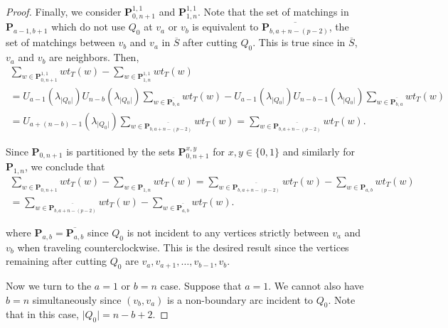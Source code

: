 \documentclass[12pt]{article}
\theoremstyle{remark}
\newcommand*{\pathset}[2]{\mathbf{P}_{#1,#2}}
\begin{document}
\begin{proof}
Finally, we consider $\pathset{0}{n+1}^{1,1}$ and $\pathset{1}{n}^{1,1}$. Note that the set of matchings in $\pathset{a-1}{b+1}$ which do not use $Q_0$ at $v_a$ or $v_b$ is equivalent to $\overline{\pathset{b}{a+n-(p-2)}}$, the set of matchings between $v_b$ and $v_a$ in $\overline{S}$ after cutting $Q_0$. This is true since in $\overline{S}$, $v_a$ and $v_b$ are neighbors. Then, \begin{align*}
  \sum_{w \in \pathset{0}{n+1}^{1,1}} wt_T(w) - \sum_{w \in \pathset{1}{n}^{1,1}} wt_T(w) \\= U_{a-1}(\lambda_{\vert Q_0\vert})U_{n-b}(\lambda_{\vert Q_0\vert}) \sum_{w \in \overline{\pathset{b}{a}}} wt_T(w) - U_{a-1}(\lambda_{\vert Q_0\vert})U_{n-b-1}(\lambda_{\vert Q_0\vert}) \sum_{w \in \overline{\pathset{b}{a}}} wt_T(w) \\
= U_{a+(n-b)-1}(\lambda_{\vert Q_0\vert})\sum_{w \in  \overline{\pathset{b}{a+n-(p-2)}}}wt_T(w) = \sum_{w \in  \overline{\pathset{b}{a+n-(p-2)}}}wt_T(w)  .
\end{align*}

Since $\pathset{0}{n+1}$ is partitioned by the sets $ \pathset{0}{n+1}^{x,y}$ for $x,y \in \{0,1\}$ and similarly for $\pathset{1}{n}$, we conclude that \begin{align*}
   \sum_{w \in \pathset{0}{n+1}} wt_T(w) - \sum_{w \in \pathset{1}{n}} wt_T(w) = \sum_{w \in  \overline{\pathset{b}{a+n-(p-2)}}}wt_T(w)  - \sum_{w \in \pathset{a}{b}}wt_T(w)\\
   = \sum_{w \in  \overline{\pathset{b}{a+n-(p-2)}}}wt_T(w)  - \sum_{w \in \overline{\pathset{a}{b}}}wt_T(w).
\end{align*}

where $\pathset{a}{b} = \overline{\pathset{a}{b}}$  since $Q_0$ is not incident to any vertices strictly between $v_a$ and $v_b$ when traveling counterclockwise. This is the desired result since the vertices remaining after cutting $Q_0$ are  $v_a,v_{a+1},\ldots,v_{b-1},v_b$.

Now we turn to the $a = 1$ or $b = n$ case. Suppose that $a =1$. We cannot also have $b = n$ simultaneously since $(v_b,v_a)$ is a non-boundary arc incident to $Q_0$. Note that in this case, $\vert Q_0 \vert = n-b+2$. 


\end{proof}
\end{document}
